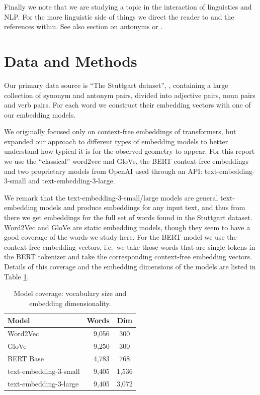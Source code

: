 \documentclass[a4paper]{article}
\theoremstyle{definition}
\theoremstyle{remark}
\numberwithin{equation}{section}
\begin{document}


Finally we note that we are studying a topic in the interaction of linguistics and NLP. For the more linguistic side of things we direct the reader to \cite{koptjevskaja2024cross} and the references within. See also \cite{hippisley2016cambridge} section on antonyms or \cite[Chapter 5]{murphy2003semantic}.

\section{Data and Methods}
\label{sec:data}

Our primary data source is ``The Stuttgart dataset'', \cite{nguyen2017distinguishing}, containing a large collection of synonym and antonym pairs, divided into adjective pairs, noun pairs and verb pairs. For each word we construct their embedding vectors with one of our embedding models. 

We originally focused only on context-free embeddings of transformers, but expanded our approach to different types of embedding models to better understand how typical it is for the observed geometry to appear. For this report we use the ``classical'' word2vec and GloVe, the BERT context-free embeddings and two proprietary models from OpenAI used through an API: text-embedding-3-small and text-embedding-3-large.


We remark that the text-embedding-3-small/large models are general text-embedding models and produce embeddings for any input text, and thus from there we get embeddings for the full set of words found in the Stuttgart dataset. Word2Vec and GloVe are static embedding models, though they seem to have a good coverage of the words we study here. For the BERT model we use the context-free embedding vectors, i.e.\ we take those words that are single tokens in the BERT tokenizer and take the corresponding context-free embedding vectors. Details of this coverage and the embedding dimensions of the models are listed in Table \ref{tab:model-coverage}.

\begin{table}[ht]
  \centering
  \caption{Model coverage: vocabulary size and embedding dimensionality.}
  \label{tab:model-coverage}
  \begin{tabular}{lrc}
  \toprule
  Model & Words & Dim \\
  \midrule
  Word2Vec         & 9{,}056 & 300 \\
  GloVe            & 9{,}250 & 300 \\
  BERT Base        & 4{,}783 & 768 \\
  text-embedding-3-small & 9{,}405 & 1{,}536 \\
  text-embedding-3-large & 9{,}405 & 3{,}072 \\
  \bottomrule
  \end{tabular}
\end{table}
\end{document}
